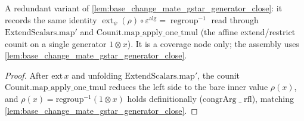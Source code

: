 \begin{lemma}
  \label{lem:base_change_mate_extendScalars_inner_value_counit}
  A redundant variant of \cref{lem:base_change_mate_gstar_generator_close}: it records the same identity \(\operatorname{ext}_\psi(\rho)\circ\varepsilon^{\mathrm{alg}}
  = \operatorname{regroup}^{-1}\) read through \(\mathrm{ExtendScalars.map'}\) and
  \(\mathrm{Counit.map\_apply\_one\_tmul}\) (the affine extend/restrict counit on a single generator
  \(1 \otimes x\)). It is a coverage node only; the assembly uses \cref{lem:base_change_mate_gstar_generator_close}.
\end{lemma}
\begin{proof}
  After \(\mathrm{ext}\,x\) and unfolding \(\mathrm{ExtendScalars.map'}\), the counit
  \(\mathrm{Counit.map\_apply\_one\_tmul}\) reduces the left side to the bare inner value \(\rho(x)\), and
  \(\rho(x) = \mathrm{regroup}^{-1}(1\otimes x)\) holds definitionally (\(\mathrm{congrArg}\;\_\;\mathrm{rfl}\)),
  matching \cref{lem:base_change_mate_gstar_generator_close}.
\end{proof}

